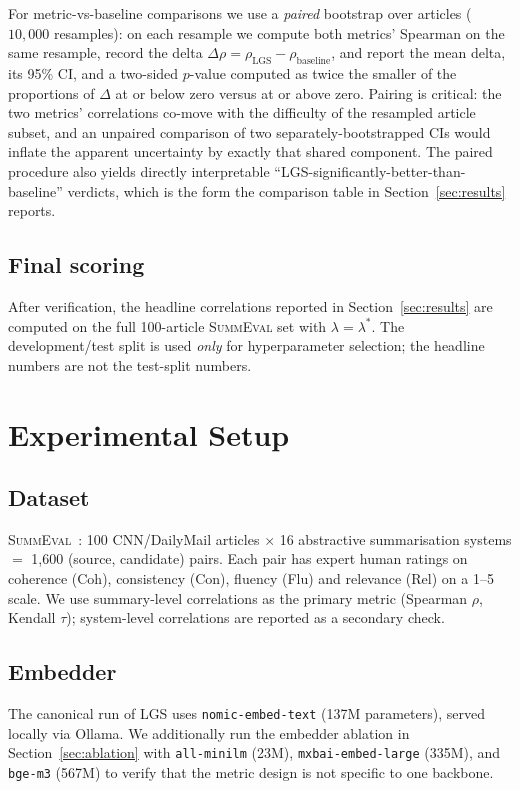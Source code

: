 \documentclass[journal]{IEEEtran}
\begin{document}
For metric-vs-baseline comparisons we use a \emph{paired}
bootstrap over articles ($10{,}000$ resamples): on each resample
we compute both metrics' Spearman on the same resample, record
the delta $\Delta\rho{=}\rho_{\text{LGS}}{-}\rho_{\text{baseline}}$,
and report the mean delta, its 95\% CI, and a two-sided
$p$-value computed as twice the smaller of the proportions of
$\Delta$ at or below zero versus at or above zero. Pairing is
critical: the two metrics' correlations co-move with the
difficulty of the resampled article subset, and an unpaired
comparison of two separately-bootstrapped CIs would inflate the
apparent uncertainty by exactly that shared component. The
paired procedure also yields directly interpretable
``LGS-significantly-better-than-baseline'' verdicts, which is
the form the comparison table in
Section~\ref{sec:results} reports.

\subsection{Final scoring}
After verification, the headline correlations reported in
Section~\ref{sec:results} are computed on the full 100-article
\textsc{SummEval} set with $\lambda = \lambda^*$. The
development/test split is used \emph{only} for hyperparameter
selection; the headline numbers are not the test-split numbers.

\section{Experimental Setup}
\label{sec:experiments}

\subsection{Dataset}
\textsc{SummEval}~\cite{fabbri2021summeval}: 100 CNN/DailyMail
articles $\times$ 16 abstractive summarisation systems
$=$ 1{,}600 (source, candidate) pairs. Each pair has expert human
ratings on coherence (Coh), consistency (Con), fluency (Flu) and
relevance (Rel) on a 1--5 scale. We use summary-level correlations
as the primary metric (Spearman $\rho$, Kendall $\tau$); system-level
correlations are reported as a secondary check.

\subsection{Embedder}
The canonical run of LGS uses \texttt{nomic-embed-text}
(137M parameters), served locally via Ollama. We additionally run
the embedder ablation in Section~\ref{sec:ablation} with
\texttt{all-minilm} (23M), \texttt{mxbai-embed-large} (335M), and
\texttt{bge-m3} (567M) to verify that the metric design is not
specific to one backbone.
\end{document}
